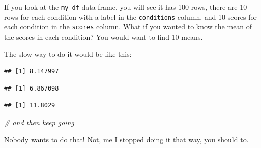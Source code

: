 \documentclass[
]{book}
\newenvironment{Shaded}{\begin{snugshade}}{\end{snugshade}}
\newcommand{\CommentTok}[1]{\textcolor[rgb]{0.56,0.35,0.01}{\textit{#1}}}
\newcommand{\FunctionTok}[1]{\textcolor[rgb]{0.00,0.00,0.00}{#1}}
\newcommand{\NormalTok}[1]{#1}
\newcommand{\SpecialCharTok}[1]{\textcolor[rgb]{0.00,0.00,0.00}{#1}}
\newcommand{\StringTok}[1]{\textcolor[rgb]{0.31,0.60,0.02}{#1}}
\begin{document}
If you look at the \texttt{my\_df} data frame, you will see it has 100 rows, there are 10 rows for each condition with a label in the \texttt{conditions} column, and 10 scores for each condition in the \texttt{scores} column. What if you wanted to know the mean of the scores in each condition? You would want to find 10 means.

The slow way to do it would be like this:

\begin{Shaded}
\end{Shaded}

\begin{verbatim}
## [1] 8.147997
\end{verbatim}

\begin{Shaded}
\end{Shaded}

\begin{verbatim}
## [1] 6.867098
\end{verbatim}

\begin{Shaded}
\end{Shaded}

\begin{verbatim}
## [1] 11.8029
\end{verbatim}

\begin{Shaded}
\begin{Highlighting}[]
\CommentTok{\# and then keep going}
\end{Highlighting}
\end{Shaded}

Nobody wants to do that! Not, me I stopped doing it that way, you should to.
\end{document}
